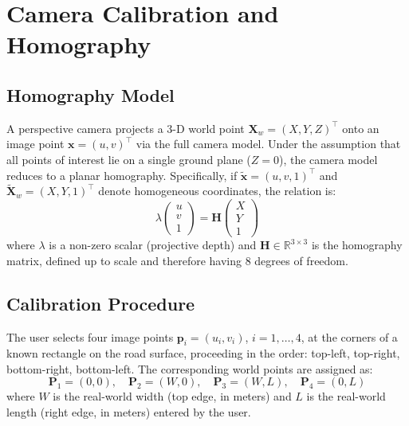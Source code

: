 \documentclass[12pt]{report}
\begin{document}
\section{Camera Calibration and Homography}

\subsection{Homography Model}

A perspective camera projects a 3-D world point $\mathbf{X}_w = (X, Y, Z)^\top$ onto an image point $\mathbf{x} = (u, v)^\top$ via the full camera model.
Under the assumption that all points of interest lie on a single ground plane ($Z = 0$), the camera model reduces to a planar homography.
Specifically, if $\tilde{\mathbf{x}} = (u, v, 1)^\top$ and $\tilde{\mathbf{X}}_w = (X, Y, 1)^\top$ denote homogeneous coordinates, the relation is:
\begin{equation}
    \lambda \begin{pmatrix} u \\ v \\ 1 \end{pmatrix}
    = \mathbf{H}
    \begin{pmatrix} X \\ Y \\ 1 \end{pmatrix}
    \label{eq:homography}
\end{equation}
where $\lambda$ is a non-zero scalar (projective depth) and $\mathbf{H} \in \mathbb{R}^{3 \times 3}$ is the homography matrix, defined up to scale and therefore having 8 degrees of freedom.

\subsection{Calibration Procedure}

The user selects four image points $\mathbf{p}_i = (u_i, v_i)$, $i = 1, \ldots, 4$, at the corners of a known rectangle on the road surface, proceeding in the order: top-left, top-right, bottom-right, bottom-left.
The corresponding world points are assigned as:
\begin{equation}
    \mathbf{P}_1 = (0, 0),\quad
    \mathbf{P}_2 = (W, 0),\quad
    \mathbf{P}_3 = (W, L),\quad
    \mathbf{P}_4 = (0, L)
\end{equation}
where $W$ is the real-world width (top edge, in meters) and $L$ is the real-world length (right edge, in meters) entered by the user.
\end{document}
